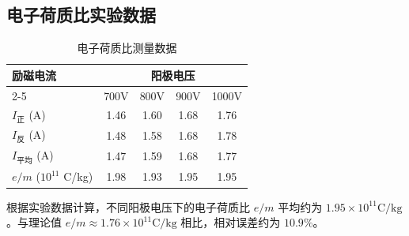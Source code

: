 \documentclass[11pt]{article}
\begin{document}
\subsection{电子荷质比实验数据}
\begin{table}[htbp]
\centering
\caption{电子荷质比测量数据}
\begin{tabular}{lcccc}
\toprule
\multirow{2}{*}{励磁电流} & \multicolumn{4}{c}{阳极电压} \\
\cmidrule(lr){2-5}
& 700V & 800V & 900V & 1000V \\
\midrule
$I_{\text{正}}$ (A) & 1.46 & 1.60 & 1.68 & 1.76 \\
$I_{\text{反}}$ (A) & 1.48 & 1.58 & 1.68 & 1.78 \\
$I_{\text{平均}}$ (A) & 1.47 & 1.59 & 1.68 & 1.77 \\
$e/m$ ($10^{11}$ C/kg) & 1.98 & 1.93 & 1.95 & 1.95 \\
\bottomrule
\end{tabular}
\end{table}

根据实验数据计算，不同阳极电压下的电子荷质比 $e/m$ 平均约为 $1.95 \times 10^{11} \mathrm{C/kg}$。与理论值 $e/m \approx 1.76 \times 10^{11} \mathrm{C/kg}$ 相比，相对误差约为 $10.9\%$。
\end{document}

